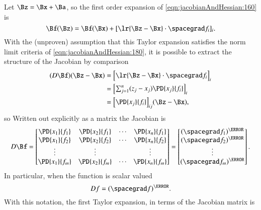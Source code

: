 Let \( \Bz = \Bx + \Ba \), so the first order expansion of \cref{eqn:jacobianAndHessian:160} is
%
\begin{equation}\label{eqn:jacobianAndHessian:200}
\Bf(\Bz)
= \Bf(\Bx) + [\lr{ \Bz - \Bx } \cdot \spacegrad f_i]_i
.
\end{equation}
%
With the (unproven) assumption that this Taylor expansion satisfies the norm limit criteria of \cref{eqn:jacobianAndHessian:180}, it is possible to extract the structure of the Jacobian by comparison
%
\begin{equation}\label{eqn:jacobianAndHessian:220}
\begin{aligned}
(D \Bf)
(\Bz - \Bx)
&=
{\begin{bmatrix}
\lr{ \Bz - \Bx } \cdot \spacegrad f_i
\end{bmatrix}}_i \\
&=
{\begin{bmatrix}
\sum_{j = 1}^n (z_j - x_j) \PD{x_j}{f_i}
\end{bmatrix}}_i \\
&=
{\begin{bmatrix}
\PD{x_j}{f_i}
\end{bmatrix}}_{ij}
(\Bz - \Bx),
\end{aligned}
\end{equation}
%
so
%
Written out explicitly as a matrix the Jacobian is
%
\begin{equation}\label{eqn:jacobianAndHessian:320}
D \Bf
=
\begin{bmatrix}
\PD{x_1}{f_1} & \PD{x_2}{f_1} & \cdots & \PD{x_n}{f_1} \\
\PD{x_1}{f_2} & \PD{x_2}{f_2} & \cdots & \PD{x_n}{f_2} \\
\vdots & \vdots & & \vdots \\
\PD{x_1}{f_m} & \PD{x_2}{f_m} & \cdots & \PD{x_n}{f_m} \\
\end{bmatrix}
=
\begin{bmatrix}
(\spacegrad f_1)^\T \\
(\spacegrad f_2)^\T \\
\vdots \\
(\spacegrad f_m)^\T
\end{bmatrix}.
\end{equation}
%
In particular, when the function is scalar valued
\begin{equation}\label{eqn:jacobianAndHessian:360}
D f = (\spacegrad f)^\T.
\end{equation}
%
With this notation, the first Taylor expansion, in terms of the Jacobian matrix is
%
%
